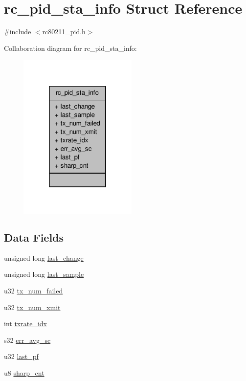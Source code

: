 \hypertarget{structrc__pid__sta__info}{\section{rc\-\_\-pid\-\_\-sta\-\_\-info Struct Reference}
\label{structrc__pid__sta__info}
}


{\ttfamily \#include $<$rc80211\-\_\-pid.\-h$>$}



Collaboration diagram for rc\-\_\-pid\-\_\-sta\-\_\-info\-:
\nopagebreak
\begin{figure}[H]
\begin{center}
\leavevmode
\includegraphics[width=166pt]{structrc__pid__sta__info__coll__graph}
\end{center}
\end{figure}
\subsection*{Data Fields}
\begin{DoxyCompactItemize}
\item 
unsigned long \hyperlink{structrc__pid__sta__info_a53675e28c7dd04fd5fb2e66dee8f484f}{last\-\_\-change}
\item 
unsigned long \hyperlink{structrc__pid__sta__info_ad13df28eb9ff39a645e7957d166e5fbd}{last\-\_\-sample}
\item 
u32 \hyperlink{structrc__pid__sta__info_a607670e1156f0a101a7e910cf70709bb}{tx\-\_\-num\-\_\-failed}
\item 
u32 \hyperlink{structrc__pid__sta__info_ada3db223fd162145ee8c39252fe1d095}{tx\-\_\-num\-\_\-xmit}
\item 
int \hyperlink{structrc__pid__sta__info_aaebb07f300f4c11055b26d9ac44b8cfc}{txrate\-\_\-idx}
\item 
s32 \hyperlink{structrc__pid__sta__info_ae03bdf9e307543490d3e9f8ebdbee20c}{err\-\_\-avg\-\_\-sc}
\item 
u32 \hyperlink{structrc__pid__sta__info_a30bbb3456871e78410e2145cbb670201}{last\-\_\-pf}
\item 
u8 \hyperlink{structrc__pid__sta__info_a20b3ceb286dda8e93db425fc68bd1a42}{sharp\-\_\-cnt}
\end{DoxyCompactItemize}


